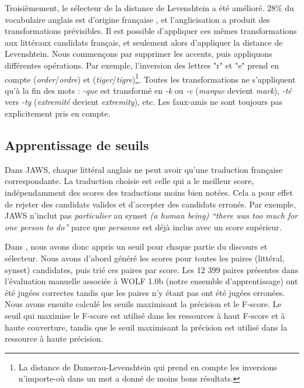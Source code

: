 Troisièmement, le sélecteur de la distance de Levenshtein a été amélioré. 28\% du vocabulaire anglais est d'origine française \citep{finkenstaedt1973ordered}, et l'anglicisation a produit des transformations prévisibles. Il est possible d'appliquer ces mêmes transformations aux littéraux candidats français, et seulement alors d'appliquer la distance de Levenshtein. Nous commençons par supprimer les accents, puis appliquons différentes opérations. Par exemple, l'inversion des lettres "r" et "e" prend en compte (\textit{order}/\textit{ordre}) et (\textit{tiger}/\textit{tigre})\footnote{La distance de Damerau-Levenshtein qui prend en compte les inversions n'importe-où dans un mot \citep{damerau1964technique} a donné de moins bons résultats.}. Toutes les transformations ne s'appliquent qu'à la fin des mots : \textit{-que} est transformé en \textit{-k} ou \textit{-c} (\textit{marque} devient \textit{mark}), \textit{-té} vers \textit{-ty} (\textit{extremité} devient \textit{extremity}), etc. Les faux-amis ne sont toujours pas explicitement pris en compte.

\subsection{Apprentissage de seuils}
\label{subsec:learning_thresholds}

Dans JAWS, chaque littéral anglais ne peut avoir qu'une traduction française correspondante. La traduction choisie est celle qui a le meilleur score, indépendamment des scores des traductions moins bien notées. Cela a pour effet de rejeter des candidats valides et d'accepter des candidats erronés. Par exemple, JAWS n'inclut pas \textit{particulier} au synset \textit{(a human being) ``there was too much for one person to do''} parce que \textit{personne} est déjà inclus avec un score supérieur.

Dans \newjaws{}, nous avons donc appris un seuil pour chaque partie du discours et sélecteur. Nous avons d'abord généré les scores pour toutes les paires (littéral, synset) candidates, puis trié ces paires par score. Les 12 399 paires présentes dans l'évaluation manuelle associée à WOLF 1.0b (notre ensemble d'apprentissage) ont été jugées correctes tandis que les paires n'y étant pas ont été jugées erronées. Nous avons ensuite calculé les seuils maximisant la précision et le F-score. Le seuil qui maximise le F-score est utilisé dans les ressources à haut F-score et à haute couverture, tandis que le seuil maximisant la précision est utilisé dans la ressource à haute précision.

